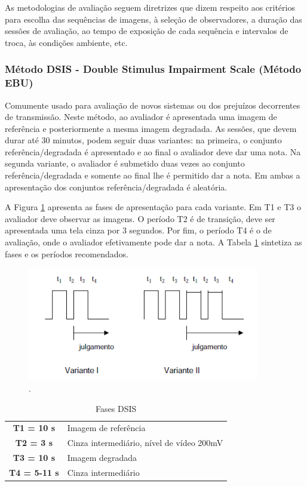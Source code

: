 As metodologias de avaliação seguem diretrizes que dizem respeito aos critérios para escolha das sequências de imagens, à seleção de observadores, a duração das sessões de avaliação, ao tempo de exposição de cada sequência e intervalos de troca, às condições ambiente, etc.

\subsubsection[Método DSIS]{Método DSIS - Double Stimulus Impairment Scale (Método EBU)}

Comumente usado para avaliação de novos sistemas ou dos prejuízos decorrentes de transmissão. Neste método, ao avaliador é apresentada uma imagem de referência e posteriormente a mesma imagem degradada. As sessões, que devem durar até 30 minutos, podem seguir duas variantes: na primeira, o conjunto referência/degradada é apresentado e ao final o avaliador deve dar uma nota. Na segunda variante, o avaliador é submetido duas vezes ao conjunto referência/degradada e somente ao final lhe é permitido dar a nota. Em ambas a apresentação dos conjuntos referência/degradada é aleatória.

A Figura \ref{fig:dsisvariantes} apresenta as fases de apresentação para cada variante. Em T1 e T3 o avaliador deve observar as imagens. O período T2 é de transição, deve ser apresentada uma tela cinza por 3 segundos. Por fim, o período T4 é o de avaliação, onde o avaliador efetivamente pode dar a nota. A Tabela \ref{tab:dsisfases} sintetiza as fases e os períodos recomendados.

\begin{figure}[!htb]
	\centering
	\includegraphics[width=0.9\textwidth]{./imgs/dsisvariantes.png}
	\caption{.}
	\label{fig:dsisvariantes}
\end{figure}

\begin{table}
	\centering
	\caption{Fases DSIS}
	\label{tab:dsisfases}
	\begin{tabular}{c|l}
		\hline
		\textbf{T1 = 10 s} & Imagem de referência \\
		\textbf{T2 = 3 s} & Cinza intermediário, nível de vídeo 200mV \\
		\textbf{T3 = 10 s} & Imagem degradada \\
		\textbf{T4 = 5-11 s} & Cinza intermediário \\
		\hline
	\end{tabular}
\end{table}

